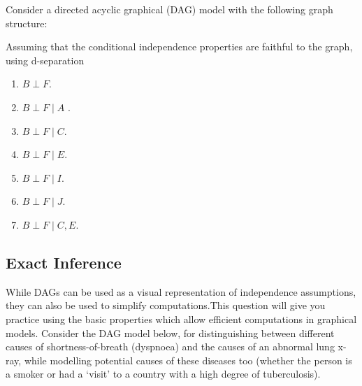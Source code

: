 \documentclass{article}
\begin{document}
Consider a  directed acyclic graphical (DAG) model with the following graph structure:

Assuming that the conditional independence properties are faithful to the graph, using d-separation 
\begin{enumerate}
\item $B \perp F$.
\item $B \perp F \; | \; A$ .
\item $B \perp F \; | \; C$.
\item $B \perp F \; | \; E$.
\item $B \perp F \; | \; I$.
\item $B \perp F \; | \; J$.
\item $B \perp F \; | \; C,E$.
\end{enumerate}



\subsection{Exact Inference}


While DAGs can be used as a visual representation of independence assumptions, they can also be used to simplify computations.This question will give you practice using the basic properties which allow efficient computations in graphical models.
Consider the DAG model below, for distinguishing between different causes of shortness-of-breath (dyspnoea) and the causes of an abnormal lung x-ray, while  modelling potential causes of these diseases too (whether the person is a smoker or had a `visit' to a country with a high degree of tuberculosis).

\end{document}
